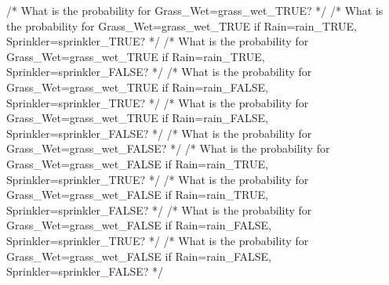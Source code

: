 \documentclass[
  11pt,
  letterpaper,
]{book}
\newenvironment{Shaded}{\begin{snugshade}}{\end{snugshade}}
\newcommand{\ErrorTok}[1]{\textcolor[rgb]{0.68,0.00,0.00}{#1}}
\begin{document}
\begin{landscape}
\begin{Shaded}
\begin{Highlighting}[]
    \ErrorTok{/*} \ErrorTok{What} \ErrorTok{is} \ErrorTok{the} \ErrorTok{probability} \ErrorTok{for} \ErrorTok{Grass\_Wet=grass\_wet\_TRUE?} \ErrorTok{*/}
    \ErrorTok{/*} \ErrorTok{What} \ErrorTok{is} \ErrorTok{the} \ErrorTok{probability} \ErrorTok{for} \ErrorTok{Grass\_Wet=grass\_wet\_TRUE} \ErrorTok{if} \ErrorTok{Rain=rain\_TRUE,} \ErrorTok{Sprinkler=sprinkler\_TRUE?} \ErrorTok{*/}
    \ErrorTok{/*} \ErrorTok{What} \ErrorTok{is} \ErrorTok{the} \ErrorTok{probability} \ErrorTok{for} \ErrorTok{Grass\_Wet=grass\_wet\_TRUE} \ErrorTok{if} \ErrorTok{Rain=rain\_TRUE,} \ErrorTok{Sprinkler=sprinkler\_FALSE?} \ErrorTok{*/}
    \ErrorTok{/*} \ErrorTok{What} \ErrorTok{is} \ErrorTok{the} \ErrorTok{probability} \ErrorTok{for} \ErrorTok{Grass\_Wet=grass\_wet\_TRUE} \ErrorTok{if} \ErrorTok{Rain=rain\_FALSE,} \ErrorTok{Sprinkler=sprinkler\_TRUE?} \ErrorTok{*/}
    \ErrorTok{/*} \ErrorTok{What} \ErrorTok{is} \ErrorTok{the} \ErrorTok{probability} \ErrorTok{for} \ErrorTok{Grass\_Wet=grass\_wet\_TRUE} \ErrorTok{if} \ErrorTok{Rain=rain\_FALSE,} \ErrorTok{Sprinkler=sprinkler\_FALSE?} \ErrorTok{*/}
    \ErrorTok{/*} \ErrorTok{What} \ErrorTok{is} \ErrorTok{the} \ErrorTok{probability} \ErrorTok{for} \ErrorTok{Grass\_Wet=grass\_wet\_FALSE?} \ErrorTok{*/}
    \ErrorTok{/*} \ErrorTok{What} \ErrorTok{is} \ErrorTok{the} \ErrorTok{probability} \ErrorTok{for} \ErrorTok{Grass\_Wet=grass\_wet\_FALSE} \ErrorTok{if} \ErrorTok{Rain=rain\_TRUE,} \ErrorTok{Sprinkler=sprinkler\_TRUE?} \ErrorTok{*/}
    \ErrorTok{/*} \ErrorTok{What} \ErrorTok{is} \ErrorTok{the} \ErrorTok{probability} \ErrorTok{for} \ErrorTok{Grass\_Wet=grass\_wet\_FALSE} \ErrorTok{if} \ErrorTok{Rain=rain\_TRUE,} \ErrorTok{Sprinkler=sprinkler\_FALSE?} \ErrorTok{*/}
    \ErrorTok{/*} \ErrorTok{What} \ErrorTok{is} \ErrorTok{the} \ErrorTok{probability} \ErrorTok{for} \ErrorTok{Grass\_Wet=grass\_wet\_FALSE} \ErrorTok{if} \ErrorTok{Rain=rain\_FALSE,} \ErrorTok{Sprinkler=sprinkler\_TRUE?} \ErrorTok{*/}
    \ErrorTok{/*} \ErrorTok{What} \ErrorTok{is} \ErrorTok{the} \ErrorTok{probability} \ErrorTok{for} \ErrorTok{Grass\_Wet=grass\_wet\_FALSE} \ErrorTok{if} \ErrorTok{Rain=rain\_FALSE,} \ErrorTok{Sprinkler=sprinkler\_FALSE?} \ErrorTok{*/}

\end{Highlighting}
\end{Shaded}
\end{landscape}
\end{document}
